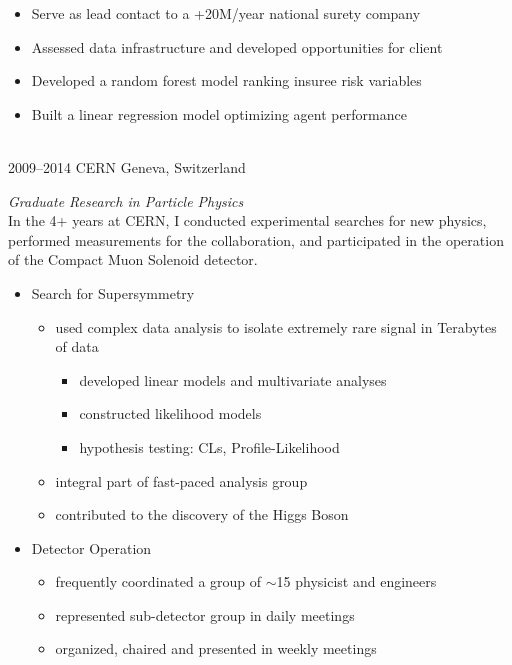\documentclass[]{friggeri-cv} %
\begin{document}
\begin{entrylist}
{\begin{itemize}
  \item Serve as lead contact to a +20M/year national surety company
  \item Assessed data infrastructure and developed opportunities for client
  \item Developed a random forest model ranking insuree risk variables
  \item Built a linear regression model optimizing agent performance 
\end{itemize}
}
~\\
\entry
{2009--2014}
{CERN}
{Geneva, Switzerland}
{\emph{Graduate Research in Particle Physics} \\
In the 4+ years at CERN, I conducted experimental searches for new physics, 
performed measurements for the collaboration, and participated in the operation 
of the Compact Muon Solenoid detector.
\begin{itemize}
\item Search for Supersymmetry
\begin{itemize}
\item used complex data analysis to isolate extremely rare signal in Terabytes of data
  \begin{itemize}
  \item developed linear models and multivariate analyses
  \item constructed likelihood models
  \item hypothesis testing: CLs, Profile-Likelihood
  \end{itemize}      
\item integral part of fast-paced analysis group
\item contributed to the discovery of the Higgs Boson 
\end{itemize}
\item Detector Operation
\begin{itemize}
\item frequently coordinated a group of $\sim$15 physicist and engineers
\item represented sub-detector group in daily meetings
\item organized, chaired and presented in weekly meetings

\end{itemize}
\end{itemize}}
\end{entrylist}
\end{document}
